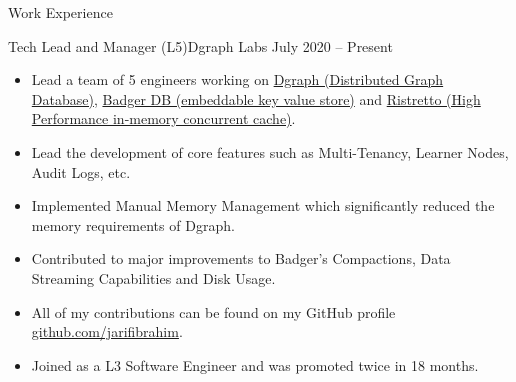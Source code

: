 \documentclass[]{mcdowellcv}
\begin{document}
	\makeheader
	\begin{cvsection}{Work Experience}
		\begin{cvsubsection}{Tech Lead and Manager (L5)}{Dgraph Labs}{ July 2020 -- Present}
			\begin{itemize}
			    \item Lead a team of 5 engineers working on 
			    \href{https://github.com/dgraph-io/dgraph}{Dgraph (Distributed Graph Database)}, \href{https://github.com/dgraph-io/badger}{Badger DB (embeddable key value store)} and \href{https://github.com/dgraph-io/ristretto}{Ristretto (High Performance in-memory concurrent cache)}.
			    \item Lead the development of core features such as Multi-Tenancy, Learner Nodes, Audit Logs, etc.
			    \item Implemented Manual Memory Management which significantly reduced the memory requirements of Dgraph.
			    \item Contributed to major improvements to Badger's Compactions, Data Streaming Capabilities and Disk Usage.
			    \item All of my contributions can be found on my GitHub profile \href{https://github.com/jarifibrahim}{github.com/jarifibrahim}.
			    \item Joined as a L3 Software Engineer and was promoted twice in 18 months.
			\end{itemize}
		\end{cvsubsection}


\end{cvsection}
\end{document}
